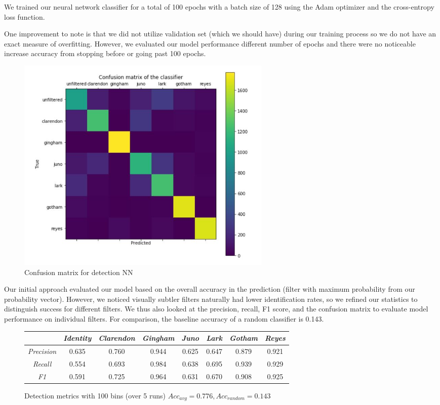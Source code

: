 \documentclass[11pt]{article}
\begin{document}
We trained our neural network classifier for a total of 100 epochs with a batch size of 128 using the Adam optimizer \cite{Adam} and the cross-entropy loss function.

One improvement to note is that we did not utilize validation set (which we should have) during our training process so we do not have an exact measure of overfitting. However, we evaluated our model performance different number of epochs and there were no noticeable increase accuracy from stopping before or going past 100 epochs.

\begin{figure}[H]
    \centering
    \includegraphics[width=0.6\textwidth]{images/confusionMatrix.jpg}
    \caption{Confusion matrix for detection NN}
    \label{fig:confusion_matrix}
\end{figure}

Our initial approach evaluated our model based on the overall accuracy in the prediction (filter with maximum probability from our probability vector). However, we noticed visually subtler filters naturally had lower identification rates, so we refined our statistics to distinguish success for different filters. We thus also looked at the precision, recall, F1 score, and the confusion matrix to evaluate model performance on individual filters. For comparison, the baseline accuracy of a random classifier is 0.143.

\begin{figure}[H]
    \centering
    \begin{tabular}{|c|c|c|c|c|c|c|c|}
        \hline    & \textit{Identity} & \textit{Clarendon} & \textit{Gingham} & \textit{Juno} & \textit{Lark} & \textit{Gotham} & \textit{Reyes}\\
        \hline \textit{Precision} & 0.635 & 0.760 & 0.944 & 0.625 & 0.647 & 0.879 & 0.921\\
        \hline \textit{Recall}    & 0.554 & 0.693 & 0.984 & 0.638 & 0.695 & 0.939 & 0.929 \\
        \hline \textit{F1}        & 0.591 & 0.725 & 0.964 & 0.631 & 0.670 & 0.908 & 0.925\\
        \hline
    \end{tabular}
    \caption{Detection metrics with 100 bins (over 5 runs) $Acc_{avg} = 0.776, Acc_{random} = 0.143$}
    \label{fig:filter_metrics}
\end{figure}
\end{document}
